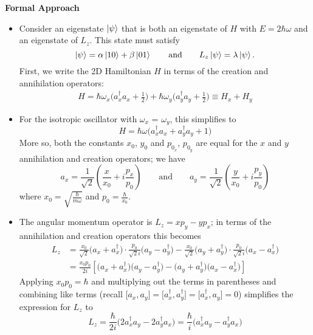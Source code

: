\documentclass[11pt, a4paper]{article}
\newcommand{\eqtext}[1]{\qquad \text{#1} \qquad}
\begin{document}
\textbf{Formal Approach}
\begin{itemize}
	\item Consider an eigenstate $ \ket{\psi} $ that is both an eigenstate of $ H $ with $ E = 2\hbar \omega $ and an eigenstate of $ L_{z} $. This state must satisfy
	\begin{equation*}
		\ket{\psi} = \alpha \ket{10} + \beta \ket{01} \eqtext{and} L_{z}\ket{\psi} = \lambda \ket{\psi}.
	\end{equation*}
	First, we write the 2D Hamiltonian $ H $ in terms of the creation and annihilation operators:
	\begin{align*}
		H = \hbar \omega_{x}\big(a_{x}^{\dagger}a_{x} + \tfrac{1}{2}\big) + \hbar \omega_{y}\big(a_{y}^{\dagger}a_{y} + \tfrac{1}{2}\big) \equiv H_{x} + H_{y}
	\end{align*}

	\item For the isotropic oscillator with $ \omega_{x} $ = $ \omega_{y} $, this simplifies to
	\begin{equation*}
		H = \hbar \omega \big(a_{x}^{\dagger}a_{x} + a_{y}^{\dagger}a_{y} + 1\big)
	\end{equation*}
	More so, both the constants $ x_{0} $, $ y_{0} $ and $ p_{0_{x}} $, $ p_{0_{y}} $ are equal for the $ x $ and $ y $ annihilation and creation operators; we have
	\begin{equation*}
		a_{x} = \frac{1}{\sqrt{2}}\left(\frac{x}{x_{0}} + i\frac{p_{x}}{p_{0}}\right) \eqtext{and} a_{y} = \frac{1}{\sqrt{2}}\left(\frac{y}{x_{0}} + i\frac{p_{y}}{p_{0}}\right)
	\end{equation*}
	where $ x_{0} = \sqrt{\frac{\hbar}{m \omega}} $ and $ p_{0} = \frac{\hbar}{x_{0}} $. 
	
	\item The angular momentum operator is $ L_{z} = x p_{y} - y p_{x} $; in terms of the annihilation and creation operators this becomes
	\begin{align*}
		L_{z} &= \frac{x_{0}}{\sqrt{2}}\big(a_{x} + a_{x}^{\dagger}\big)\cdot \frac{p_{0}}{\sqrt{2}i}\big(a_{y} - a_{y}^{\dagger}\big) - \frac{x_{0}}{\sqrt{2}}\big(a_{y} + a_{y}^{\dagger}\big)\cdot \frac{p_{0}}{\sqrt{2}i}\big(a_{x} - a_{x}^{\dagger}\big)\\
		&=\frac{x_{0}p_{0}}{2i}\left[\big(a_{x}+a_{x}^{\dagger}\big)\big(a_{y}-a_{y}^{\dagger}\big) - \big(a_{y}+a_{y}^{\dagger}\big)\big(a_{x}-a_{x}^{\dagger}\big)\right]
	\end{align*}
	Applying $ x_{0}p_{0} = \hbar $ and multiplying out the terms in parentheses and combining like terms (recall $ \big[a_{x}, a_{y}\big] = \big[a_{x}^{\dagger}, a_{y}^{\dagger}\big] =  \big[a_{x}^{\dagger}, a_{y}\big] = 0$) simplifies the expression for $ L_{z} $  to
	\begin{equation*}
		L_{z} = \frac{\hbar}{2i}\big(2a_{x}^{\dagger}a_{y} - 2a_{y}^{\dagger}a_{x}\big) = \frac{\hbar}{i}\big(a_{x}^{\dagger}a_{y} - a_{y}^{\dagger}a_{x}\big)
	\end{equation*}
	

\end{itemize}
\end{document}
